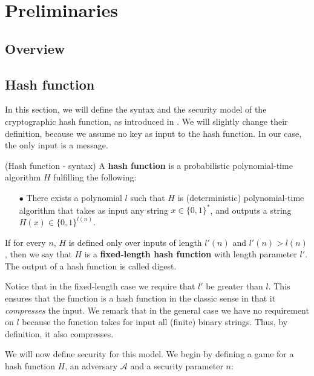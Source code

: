 \chapter*{Preliminaries}
%
\setcounter{section}{0}
\section{Overview}
%
\section{Hash function}
%
In this section, we will define the syntax and the security model of the cryptographic hash function, as introduced in \cite{Katz:2007:IMC:1206501}. We will slightly change their definition, because we assume no key as input to the hash function. In our case, the only input is a message.
%
\begin{definition}{(Hash function - syntax)} \textnormal{\cite{Katz:2007:IMC:1206501}}
A \textbf{hash function} is a probabilistic polynomial-time algorithm $H$
fulfilling the following:
\begin{itemize}
  \item[$\bullet$] There exists a polynomial $l$ such that $H$ is (deterministic) polynomial-time
  algorithm that takes as input any string $x \in { \{ 0,1 \}}^*$, and outputs
  a string $H(x) \in { \{ 0,1 \}}^{l(n)}$.
\end{itemize}
If for every $n$, $H$ is defined only over inputs of length $l'(n)$ and $l'(n) > l(n)$, then
we say that $H$ is a \textbf{fixed-length hash function} with length parameter $l'$. The output of a hash function is called digest.
\end{definition}

Notice that in the fixed-length case we require that $l'$ be greater than $l$. This ensures that the
function is a hash function in the classic sense in that it \textit{compresses} the input. We remark
that in the general case we have no requirement on $l$ because the function takes for input all (finite) binary strings. Thus, by definition, it also compresses.

We will now define security for this model. We begin by defining a game for a hash function $H$, an adversary $\mathcal{A}$ and a security parameter $n$:
\\

